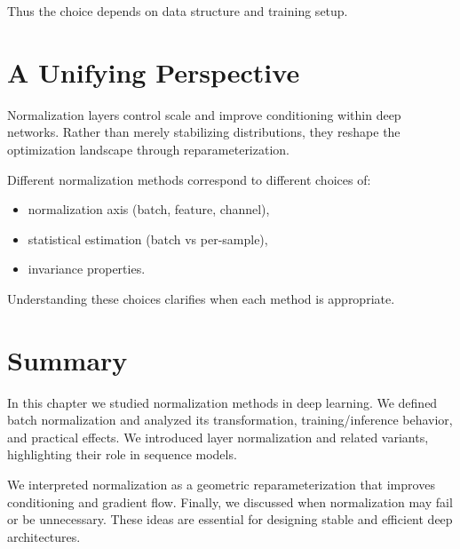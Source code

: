 Thus the choice depends on data structure and training setup.

\section{A Unifying Perspective}

Normalization layers control scale and improve conditioning within deep networks. Rather than merely stabilizing distributions, they reshape the optimization landscape through reparameterization.

Different normalization methods correspond to different choices of:
\begin{itemize}
    \item normalization axis (batch, feature, channel),
    \item statistical estimation (batch vs per-sample),
    \item invariance properties.
\end{itemize}

Understanding these choices clarifies when each method is appropriate.

\section{Summary}

In this chapter we studied normalization methods in deep learning. We defined batch normalization and analyzed its transformation, training/inference behavior, and practical effects. We introduced layer normalization and related variants, highlighting their role in sequence models.

We interpreted normalization as a geometric reparameterization that improves conditioning and gradient flow. Finally, we discussed when normalization may fail or be unnecessary. These ideas are essential for designing stable and efficient deep architectures.